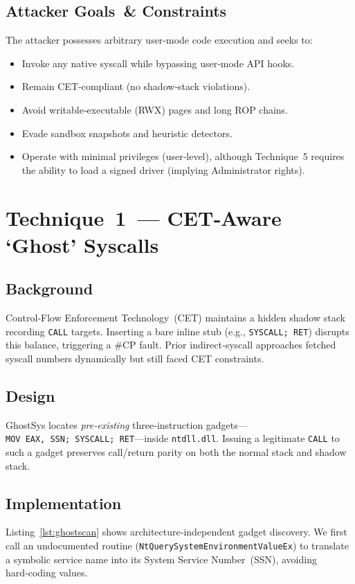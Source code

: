 \documentclass[11pt,letterpaper]{article}
\begin{document}
\subsection{Attacker Goals \& Constraints}
The attacker possesses arbitrary user‑mode code execution and seeks to:
\begin{itemize}
  \item Invoke any native syscall while bypassing user‑mode API hooks.
  \item Remain CET‑compliant (no shadow‑stack violations).
  \item Avoid writable‑executable (RWX) pages and long ROP chains.
  \item Evade sandbox snapshots and heuristic detectors.
  \item Operate with minimal privileges (user‑level), although Technique 5 requires the ability to load a signed driver (implying Administrator rights).
\end{itemize}

\section{Technique 1 — CET‑Aware `Ghost' Syscalls}
\label{sec:ghost}
\subsection{Background}
Control‑Flow Enforcement Technology (CET) maintains a hidden shadow stack recording \texttt{CALL} targets. Inserting a bare inline stub (e.g., \texttt{SYSCALL; RET}) disrupts this balance, triggering a \#CP fault. Prior indirect‑syscall approaches fetched syscall numbers dynamically but still faced CET constraints.

\subsection{Design}
GhostSys locates \emph{pre‑existing} three‑instruction gadgets—\texttt{MOV EAX, SSN; SYSCALL; RET}—inside \texttt{ntdll.dll}. Issuing a legitimate \texttt{CALL} to such a gadget preserves call/return parity on both the normal stack and shadow stack.

\subsection{Implementation}
Listing~\ref{lst:ghostscan} shows architecture‑independent gadget discovery. We first call an undocumented routine (\texttt{NtQuerySystemEnvironmentValueEx}) to translate a symbolic service name into its System Service Number (SSN), avoiding hard‑coding values.
\end{document}
